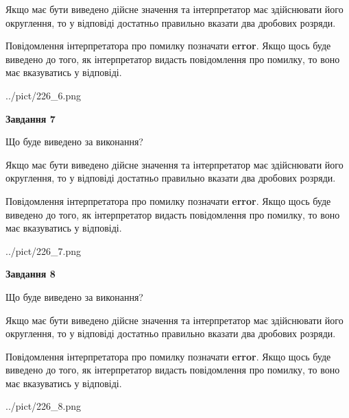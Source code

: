 \documentclass[12pt, ukrainian]{article}
\begin{document}
{\begin {Large}
Якщо має бути виведено дійсне значення та інтерпретатор має здійснювати його округлення, 
то у відповіді достатньо правильно вказати два дробових розряди.

Повідомлення інтерпретатора про помилку позначати \textbf{error}.
Якщо щось буде виведено до того, як інтерпретатор видасть повідомлення про помилку, 
то воно має вказуватись у відповіді. \par

\begin{center}
	{../pict/226_6.png}
\end{center}
\newpage

{\begin {center}\textbf{Завдання 7}\end {center}}\par
Що буде виведено за виконання? \par

Якщо має бути виведено дійсне значення та інтерпретатор має здійснювати його округлення, 
то у відповіді достатньо правильно вказати два дробових розряди.

Повідомлення інтерпретатора про помилку позначати \textbf{error}.
Якщо щось буде виведено до того, як інтерпретатор видасть повідомлення про помилку, 
то воно має вказуватись у відповіді. \par

\begin{center}
	{../pict/226_7.png}
\end{center}
\newpage

{\begin {center}\textbf{Завдання 8}\end {center}}\par
Що буде виведено за виконання? \par

Якщо має бути виведено дійсне значення та інтерпретатор має здійснювати його округлення, 
то у відповіді достатньо правильно вказати два дробових розряди.

Повідомлення інтерпретатора про помилку позначати \textbf{error}.
Якщо щось буде виведено до того, як інтерпретатор видасть повідомлення про помилку, 
то воно має вказуватись у відповіді. \par

\begin{center}
	{../pict/226_8.png}
\end{center}
\newpage


\end{Large}}
\end{document}
